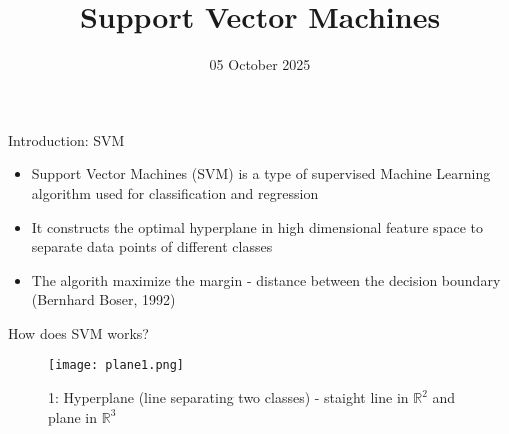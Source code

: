 \documentclass{beamer}
\title{Support Vector Machines}
\author{} %
\institute{Department of Physics and Astronomy}
\date{05 October 2025}
\begin{document}
\begin{frame}
\titlepage
\vspace{1em}
\centering
\small 
\end{frame}



\begin{frame}[t]{Introduction: SVM}\vspace{9.7mm}
\begin{itemize}
\item Support Vector Machines (SVM) is a type of supervised Machine Learning algorithm used for classification and regression
\vspace{0.5cm}
\item It constructs the optimal hyperplane in high dimensional feature space to separate data points of different classes
\vspace{0.5cm}
\item The algorith maximize the margin - distance between the decision boundary (Bernhard Boser, 1992)
\vspace{0.5cm}


\end{itemize}
\end{frame}

\begin{frame}[t]{How does SVM works?}\vspace{0.4cm}
\vspace{0.4cm}
\centering  %

\begin{figure}
    \texttt{[image: plane1.png]}
    \caption{1: Hyperplane (line separating two classes) - staight line in $\mathbb{R}^2$ and plane in $\mathbb{R}^3$}
\end{figure}







\end{frame}
\end{document}
